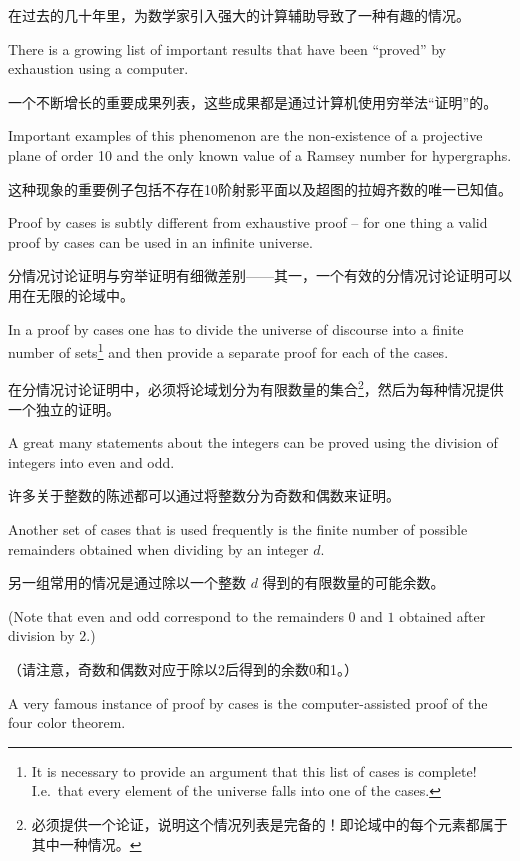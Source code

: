 在过去的几十年里，为数学家引入强大的计算辅助导致了一种有趣的情况。

There
is a growing list of important results that have been ``proved'' by
exhaustion using a computer.

一个不断增长的重要成果列表，这些成果都是通过计算机使用穷举法“证明”的。

Important examples of this phenomenon
are the non-existence of a
projective plane of order 10\cite{lam} and the
only known value of a
Ramsey number for hypergraphs\cite{radz}.

这种现象的重要例子包括不存在10阶射影平面\cite{lam}以及超图的拉姆齐数的唯一已知值\cite{radz}。

Proof by cases is subtly different from exhaustive proof -- for one
thing a valid proof by cases can be used in an infinite universe.

分情况讨论证明与穷举证明有细微差别——其一，一个有效的分情况讨论证明可以用在无限的论域中。

In a proof by cases one has to divide the universe of discourse into
a finite number of sets\footnote{It is necessary to provide an argument that
      this list of cases is complete!
      I.e.\ that every element of the universe
      falls into one of the cases.} and then provide a separate proof for each
of the cases.

在分情况讨论证明中，必须将论域划分为有限数量的集合\footnote{必须提供一个论证，说明这个情况列表是完备的！即论域中的每个元素都属于其中一种情况。}，然后为每种情况提供一个独立的证明。

A great many statements about the integers can be proved
using the division of integers into even and odd.

许多关于整数的陈述都可以通过将整数分为奇数和偶数来证明。

Another set of
cases that is used frequently is the finite number of possible remainders
obtained when dividing by an integer $d$.

另一组常用的情况是通过除以一个整数 $d$ 得到的有限数量的可能余数。

(Note that even and odd correspond
to the remainders $0$ and $1$ obtained after division by $2$.)

（请注意，奇数和偶数对应于除以2后得到的余数0和1。）

A very famous instance of proof by cases is the computer-assisted proof
of the
four color theorem.

